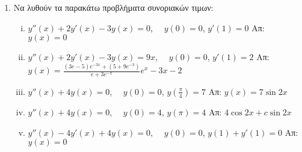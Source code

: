 


\thispagestyle{empty}



\begin{center}
\end{center}

\vspace{\baselineskip}


\begin{enumerate}
  \item Να λυθούν τα παρακάτω προβλήματα συνοριακών τιμων:
  \begin{enumerate}[i)]
    \item $y''(x)+2y'(x)-3y(x)=0$, $\quad y(0)=0$, $y'(1)=0$ \hfill Απ: $y(x)=0$
    \item $y''(x)+2y'(x)-3y(x)=9x$, $\quad y(0)=0$, $y'(1)=2$ \hfill Απ: $\scriptstyle{y(x)=\frac{(3e-5)e^{-3x}+(5+9e^{-3})}{e+3e^{-x}}e^{x}-3x-2}$
    \item $y''(x)+4y(x)=0$, $\quad y(0)=0$, $y(\frac{\pi}{4})=7$ \hfill Απ: $y(x)=7\sin 2x$
    \item $y''(x)+4y(x)=0$, $\quad y(0)=4$, $y(\pi)=4$ \hfill Απ: $4\cos 2x+c\sin 2x$
    \item $y''(x)-4y'(x)+4y(x)=0$, $\quad y(0)=0$, $y(1)+y'(1)=0$ \hfill Απ: $y(x)=0$
  \end{enumerate}


\end{enumerate}
